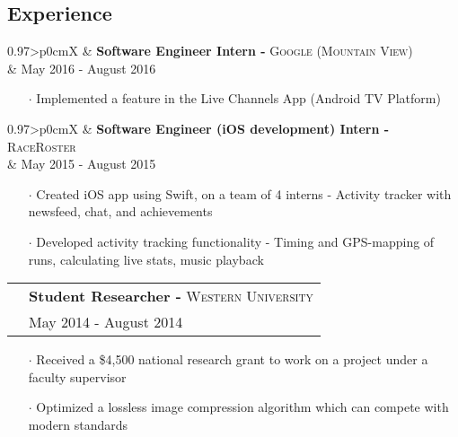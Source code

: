 \documentclass[letterpaper, oneside, final]{scrartcl} %
\newcommand{\gray}{\rowcolor[gray]{.90}} %
\begin{document}
\begin{center}
\vspace{-3mm}

\section{Experience}

\renewcommand{\arraystretch}{1.3}

\begin{tabularx}{0.97\linewidth}{>{\raggedleft\scshape}p{0cm}X}
\gray & \textbf{Software Engineer Intern -} \textsc{Google (Mountain View)}\\
\gray & {May 2016 - August 2016}\\
\end{tabularx}
\vspace{-0.1cm}
\begin{itemize} \itemsep-0.2cm
\item[$\cdot$] Implemented a feature in the Live Channels App (Android TV Platform)

\end{itemize}

\vspace{-0.05cm}

\begin{tabularx}{0.97\linewidth}{>{\raggedleft\scshape}p{0cm}X}
\gray & \textbf{Software Engineer (iOS development) Intern -} \textsc{RaceRoster}\\
\gray & {May 2015 - August 2015}\\
\end{tabularx}
\vspace{-0.1cm}
\begin{itemize} \itemsep-0.2cm
\item[$\cdot$] Created iOS app using Swift, on a team of 4 interns - Activity tracker with newsfeed, chat, and achievements \\
\item[$\cdot$] Developed activity tracking functionality - Timing and GPS-mapping of runs, calculating live stats, music playback
\end{itemize}

\vspace{-0.05cm}

\begin{tabularx}{0.97\linewidth}{>{\raggedleft\scshape}p{0cm}X}
\gray & \textbf{Student Researcher -} \textsc{Western University}\\
\gray & {May 2014 - August 2014}\\
\end{tabularx}
\vspace{-0.1cm}
\begin{itemize}\itemsep-0.2cm
\item[$\cdot$] Received a \$4,500 national research grant to work on a project under a faculty supervisor
\item[$\cdot$] Optimized a lossless image compression algorithm which can compete with modern standards\\
\end{itemize}


\end{center}
\end{document}

